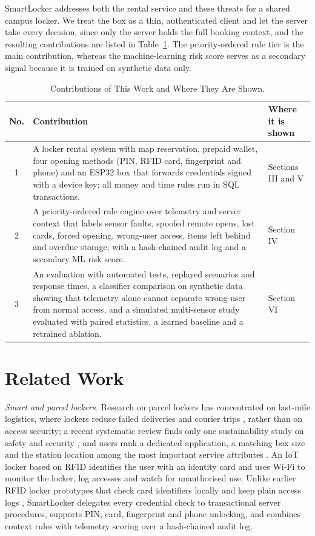 \documentclass[journal,onecolumn]{IEEEtran}
\begin{document}
SmartLocker addresses both the rental service and these threats for a shared campus locker. We treat the box as a thin,
authenticated client and let the server take every decision, since only the server holds the full booking context, and
the resulting contributions are listed in Table~\ref{tab:contrib}. The priority-ordered rule tier is the main
contribution, whereas the machine-learning risk score serves as a secondary signal because it is trained on synthetic
data only.

\begin{table}[!htbp]
\renewcommand{\arraystretch}{1.02}
\centering
\small
\caption{Contributions of This Work and Where They Are Shown.}
\label{tab:contrib}
\vspace{5pt}
\begin{tabular}{c p{11.9cm} p{2.7cm}}
\hline
No. & Contribution & Where it is shown \\
\hline
\rule{0pt}{2.6ex}1 & A locker rental system with map reservation, prepaid wallet, four opening methods (PIN, RFID card, fingerprint and
    phone) and an ESP32 box that forwards credentials signed with a device key; all money and time rules run in SQL transactions. & Sections III and V \\
2 & A priority-ordered rule engine over telemetry and server context that labels sensor faults, spoofed remote opens,
    lost cards, forced opening, wrong-user access, items left behind and overdue storage, with a hash-chained audit log and a secondary ML risk score. & Section IV \\
3 & An evaluation with automated tests, replayed scenarios and response times, a classifier comparison on synthetic
    data showing that telemetry alone cannot separate wrong-user from normal access, and a simulated multi-sensor
    study evaluated with paired statistics, a learned baseline and a retrained ablation. & Section VI \\
\hline
\end{tabular}
\end{table}

\section{Related Work}

\textit{Smart and parcel lockers.} Research on parcel lockers has concentrated on last-mile logistics, where lockers
reduce failed deliveries and courier trips \cite{iwan2016parcel}, rather than on access security; a recent systematic
review finds only one sustainability study on safety and security \cite{zhang2025parcel}, and users rank a dedicated
application, a matching box size and the station location among the most important service attributes
\cite{ciesla2023parcel}. An IoT
locker based on RFID \cite{rfidiot2023locker} identifies the user with an identity card and uses Wi-Fi to monitor the
locker, log accesses and watch for unauthorised use. Unlike earlier RFID locker prototypes that check card identifiers
locally and keep plain access logs \cite{rfidiot2023locker}, SmartLocker delegates every credential check to
transactional server procedures, supports PIN, card, fingerprint and phone unlocking, and combines context rules with
telemetry scoring over a hash-chained audit log.
\end{document}
